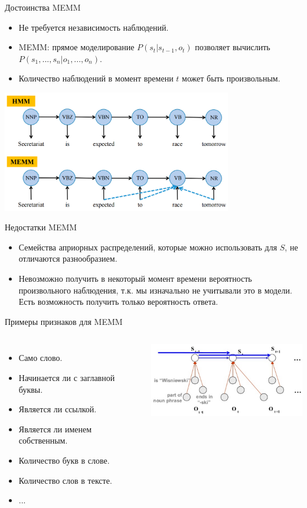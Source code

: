\documentclass{beamer}
\begin{document}
\begin{frame}{Достоинства MEMM}
\begin{itemize}
\item Не требуется независимость наблюдений.
\item MEMM: прямое моделирование $P(s_t|s_{t-1},o_t)$ позволяет вычислить $P(s_1,...,s_n|o_1,...,o_n)$.
\item Количество наблюдений в момент времени $t$ может быть произвольным.
\end{itemize}
\centerline{\includegraphics[width=10cm]{fig/hmmmemm2.png}}
\end{frame}

\begin{frame}{Недостатки MEMM}
\begin{itemize}
\item Семейства априорных распределений, которые можно использовать для $S$, не отличаются разнообразием.
\item Невозможно получить в некоторый момент времени вероятность произвольного наблюдения, т.к. мы изначально не учитывали это в модели. Есть возможность получить только вероятность ответа.
\end{itemize}
\end{frame}

\begin{frame}{Примеры признаков для MEMM}
\begin{columns}[c]
\begin{itemize}
\item Само слово.
\item Начинается ли с заглавной буквы.
\item Является ли ссылкой.
\item Является ли именем собственным.
\item Количество букв в слове.
\item Количество слов в тексте.
\item ...
\end{itemize}
\includegraphics[width=7cm]{fig/memm1.png}
\end{columns}
\end{frame}
\end{document}
